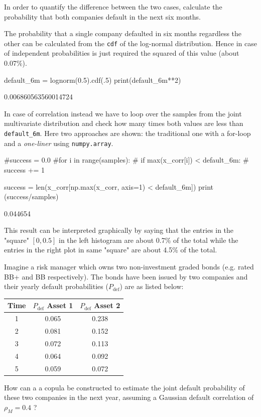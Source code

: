 \begin{solution}
In order to quantify the difference between the two cases, calculate the probability that both companies default in the next six months.

The probability that a single company defaulted in six months regardless the other can be calculated from the \texttt{cdf} of the log-normal distribution. Hence in case of independent probabilities is just required the squared of this value (about 0.07\%).

\begin{ipython}
default_6m = lognorm(0.5).cdf(.5)
print(default_6m**2)
\end{ipython}
\begin{ioutput}
0.006860563560014724
\end{ioutput}

In case of correlation instead we have to loop over the samples from the joint multivariate distribution and check how many times both values are less than \texttt{default\_6m}. Here two approaches are shown: the traditional one with a for-loop and a \emph{one-liner} using \texttt{numpy.array}.

\begin{ipython}
#success = 0.0
#for i in range(samples):
#    if max(x_corr[i]) < default_6m:
#        success += 1

success = len(x_corr[np.max(x_corr, axis=1) < default_6m])
print (success/samples)
\end{ipython}
\begin{ioutput}
0.044654
\end{ioutput}

This result can be interpreted graphically by saying that the entries in the "square" $[0, 0.5]$ in the left histogram are about 0.7\% of the total while the entries in the right plot in same "square" are about 4.5\% of the total. 
\end{solution}

\begin{question}
Imagine a risk manager which owns two non-investment graded bonds (e.g. rated BB+ and BB respectively). The bonds have been issued by two companies and their yearly default probabilities ($P_{\mathrm{def}}$) are as listed below:

\begin{table}[htbp]
\centering
\begin{tabular}{|c|c|c|}
\hline
Time & $P_{\mathrm{def}}$ Asset 1 & $P_{\mathrm{def}}$ Asset 2 \\
\hline
\hline
1 & 0.065 & 0.238 \\
2 & 0.081 & 0.152 \\
3 & 0.072 & 0.113 \\
4 & 0.064 & 0.092 \\
5 & 0.059 & 0.072 \\
\hline
\end{tabular}
\end{table}

How can a a copula be constructed to estimate the joint default probability of these two companies in the next year, assuming a Gaussian default correlation of $\rho_M = 0.4$ ?
\end{question}

